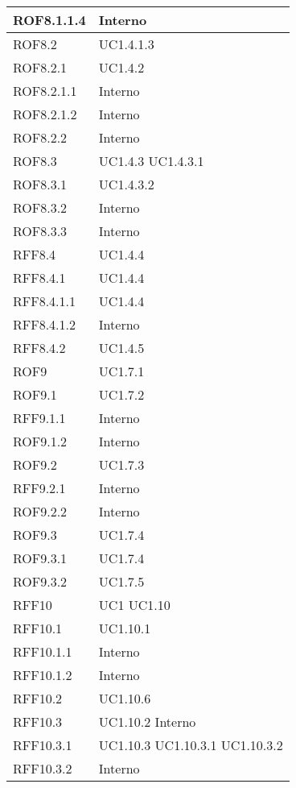 \begin{center}
\begin{longtable}{| p{4cm} | p{4cm} |}
ROF8.1.1.4   &  Interno \\
\hline
ROF8.2   &  UC1.4.1.3 \\
\hline
ROF8.2.1   &  UC1.4.2 \\
\hline
ROF8.2.1.1   &  Interno \\
\hline
ROF8.2.1.2   &  Interno \\
\hline
ROF8.2.2   &  Interno \\
\hline
ROF8.3   &  UC1.4.3 \newline UC1.4.3.1  \\
\hline
ROF8.3.1   &  UC1.4.3.2 \\
\hline
ROF8.3.2   &  Interno \\
\hline
ROF8.3.3   &  Interno \\
\hline
RFF8.4   &  UC1.4.4  \\
\hline
RFF8.4.1   &  UC1.4.4  \\
\hline
RFF8.4.1.1   &  UC1.4.4  \\
\hline
RFF8.4.1.2   &  Interno  \\
\hline
RFF8.4.2   &  UC1.4.5  \\
\hline
ROF9   &  UC1.7.1 \\
\hline
ROF9.1   &  UC1.7.2 \\
\hline
RFF9.1.1   &  Interno \\
\hline
ROF9.1.2   &  Interno \\
\hline
ROF9.2   &  UC1.7.3 \\
\hline
RFF9.2.1   &  Interno \\
\hline
ROF9.2.2   &  Interno \\
\hline
ROF9.3   &  UC1.7.4 \\
\hline
ROF9.3.1   &  UC1.7.4 \\
\hline
ROF9.3.2   &  UC1.7.5 \\
\hline
RFF10   &  UC1 \newline UC1.10 \\
\hline
RFF10.1   &  UC1.10.1 \\
\hline
RFF10.1.1   &  Interno \\
\hline
RFF10.1.2   &  Interno \\
\hline
RFF10.2   &  UC1.10.6 \\
\hline
RFF10.3   &  UC1.10.2 \newline Interno \\
\hline
RFF10.3.1   &  UC1.10.3 \newline UC1.10.3.1 \newline UC1.10.3.2 \\
\hline
RFF10.3.2   &  Interno \\

\end{longtable}
\end{center}
